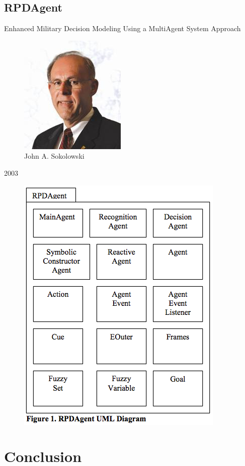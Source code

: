 \documentclass{article}
\begin{document}
\subsection{RPDAgent}
Enhanced Military Decision Modeling Using a MultiAgent System Approach
\begin{figure}[H]
	\begin{centering}
	\includegraphics[scale=0.5]{../ressources/john_sokolowski}
	\caption{John A. Sokolowski}
	\end{centering}
\end{figure}
2003
\begin{figure}[H]
	\begin{centering}
	\includegraphics[scale=0.9]{../ressources/RPDagent_uml}
	\caption{}
	\end{centering}
\end{figure}
\cite{sokolowski2003}


\section{Conclusion}


\newpage


\end{document}
